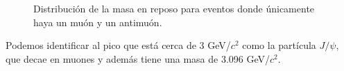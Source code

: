 \documentclass[11pt]{article}
\begin{document}
\pagebreak


\begin{figure}[H]
\centering
{}

\caption{Distribución de la masa en reposo para eventos donde únicamente haya un muón y un antimuón.}
\label{fig:Prob4}
\end{figure}

Podemos identificar al pico que está cerca de 3 GeV/$c^2$ como la partícula $J/\psi$, que decae en muones y además tiene una masa de 3.096 GeV/$c^2$.
\end{document}
